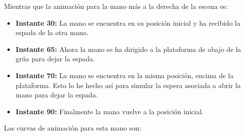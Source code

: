 \bigskip


Mientras que la animación para la mano más a la derecha de la escena es: 

\begin{itemize}
    \item \textbf{Instante 30: }La mano se encuentra en su posición inicial y ha recibido la espada de la otra mano.
    \item \textbf{Instante 65: }Ahora la mano se ha dirigido a la plataforma de abajo de la grúa para dejar la espada.
    \item \textbf{Instante 70: }La mano se encuentra en la misma posición, encima de la plataforma. Esto lo he hecho así para simular la espera asociada a abrir la mano para dejar la espada.
    \item \textbf{Instante 90: }Finalmente la mano vuelve a la posición inicial.
\end{itemize}

Las curvas de animación para esta mano son:

